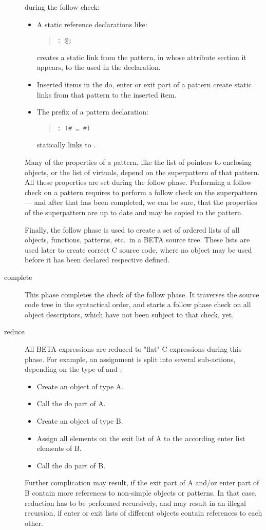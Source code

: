 \begin{description}
    during the follow check:
    \begin{itemize}
    \item A static reference declarations like:
	\begin{quote}\tt{}: @;\end{quote}
	creates a static link from the pattern, in whose
	attribute section it appears, to the 
	used in the declaration.
    \item Inserted items in the do, enter or exit part of a
	pattern create static links from that pattern to the
	inserted item.
    \item The prefix of a pattern declaration:
	\begin{quote}\tt {}:  (\# \ldots\ \#)
	\end{quote}
	statically links  to .
    \end{itemize}
    Many of the properties of a pattern, like the list of
    pointers to enclosing objects, or the list of virtuals,
    depend on the superpattern of that pattern.  All these
    properties are set during the follow phase. Performing a
    follow check on a pattern requires to perform a follow check
    on the superpattern --- and after that has been completed, we
    can be sure, that the properties of the superpattern are up
    to date and may be copied to the pattern.

    Finally, the follow phase is used to create a set of ordered
    lists of all objects, functions, patterns, etc.\ in a BETA
    source tree.  These lists are used later to create correct
    C source code, where no object may be used before it has
    been declared respective defined.
\item[complete] This phase completes the check of the follow
    phase.  It traverses the source code tree in the syntactical
    order, and starts a follow phase check on all object
    descriptors, which have not been subject to that check, yet.
\item[reduce] All BETA expressions are reduced to "flat" C
    expressions during this phase. For example, an assignment
     is split into several sub-actions, depending
    on the type of  and :
    \begin{itemize}
    \item Create an object of type A.
    \item Call the do part of A.
    \item Create an object of type B.
    \item Assign all elements on the exit list of A to the
	    according enter list elements of B.
    \item Call the do part of B.
    \end{itemize}
    Further complication may result, if the exit part of A
    and/or enter part of B contain more references to
    non-simple objects or patterns.  In that case,
    reduction has to be performed recursively, and may
    result in an illegal recursion, if enter or exit lists
    of different objects contain references to each other.


\end{description}

